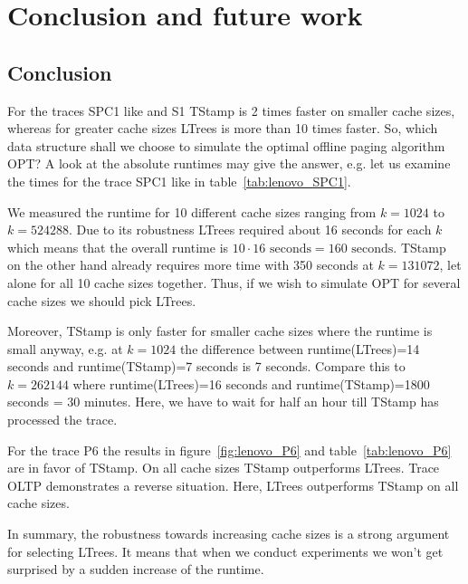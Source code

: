 \documentclass[a4paper,12pt, titlepage]{article}  %
\begin{document}
\newpage
\section{Conclusion and future work}
\subsection{Conclusion}
For the traces SPC1 like and S1 TStamp is 2 times faster on smaller cache sizes, whereas for greater cache sizes
LTrees is more than 10 times faster. So, which data structure shall we choose to simulate the optimal 
offline paging algorithm OPT? A look at the absolute runtimes may give the answer, e.g. let us 
examine the times for the trace SPC1 like in table~\ref{tab:lenovo_SPC1}.

We measured the runtime for 10 different cache sizes ranging from $k=1024$ to $k=524288$. 
Due to its robustness LTrees required about 16 seconds for each $k$ which means that the overall runtime is 
$10 \cdot 16 \text{ seconds} = 160 \text{ seconds}$. TStamp on the other hand already requires 
more time with 350 seconds at $k=131072$, let alone for all 10 cache sizes together.
Thus, if we wish to simulate OPT for several cache sizes we should pick LTrees. 

Moreover, TStamp is only faster for smaller cache sizes where the runtime is small anyway, e.g. at 
$k=1024$ the difference between runtime(LTrees)=14 seconds and runtime(TStamp)=7 seconds
is 7 seconds. Compare this to $k=262144$ where runtime(LTrees)=16 seconds and 
runtime(TStamp)=1800 seconds = 30 minutes. Here, we have to wait for half an hour till TStamp
has processed the trace. 

For the trace P6 the results in figure~\ref{fig:lenovo_P6} and table~\ref{tab:lenovo_P6} are in favor of TStamp.
On all cache sizes TStamp outperforms LTrees. Trace OLTP demonstrates a reverse situation. 
Here, LTrees outperforms TStamp on all cache sizes. 

In summary, the robustness towards increasing cache sizes is a strong argument for selecting LTrees.
It means that when we conduct experiments we won't get surprised by a sudden increase of the runtime. 
\end{document}
